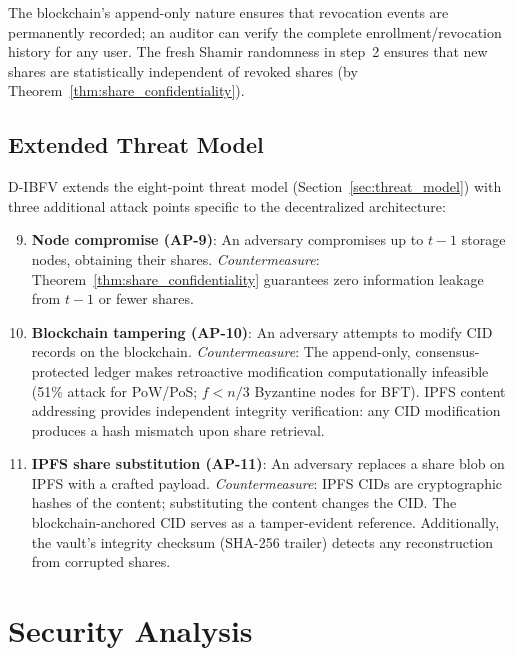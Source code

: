 \documentclass[3p,twocolumn]{elsarticle}
\newcommand{\DIBFV}{\textsf{D-IBFV}}
\begin{document}
\noindent The blockchain's append-only nature ensures that revocation events are permanently recorded; an auditor can verify the complete enrollment/revocation history for any user. The fresh Shamir randomness in step~2 ensures that new shares are statistically independent of revoked shares (by Theorem~\ref{thm:share_confidentiality}).

\subsection{Extended Threat Model}
\label{sec:extended_threat}

\DIBFV{} extends the eight-point threat model (Section~\ref{sec:threat_model}) with three additional attack points specific to the decentralized architecture:

\begin{enumerate}
    \setcounter{enumi}{8}
    \item \textbf{Node compromise (AP-9)}: An adversary compromises up to $t{-}1$ storage nodes, obtaining their shares. \emph{Countermeasure}: Theorem~\ref{thm:share_confidentiality} guarantees zero information leakage from $t{-}1$ or fewer shares.
    \item \textbf{Blockchain tampering (AP-10)}: An adversary attempts to modify CID records on the blockchain. \emph{Countermeasure}: The append-only, consensus-protected ledger makes retroactive modification computationally infeasible (51\% attack for PoW/PoS; $f < n/3$ Byzantine nodes for BFT). IPFS content addressing provides independent integrity verification: any CID modification produces a hash mismatch upon share retrieval.
    \item \textbf{IPFS share substitution (AP-11)}: An adversary replaces a share blob on IPFS with a crafted payload. \emph{Countermeasure}: IPFS CIDs are cryptographic hashes of the content; substituting the content changes the CID. The blockchain-anchored CID serves as a tamper-evident reference. Additionally, the vault's integrity checksum (SHA-256 trailer) detects any reconstruction from corrupted shares.
\end{enumerate}

\section{Security Analysis}
\label{sec:security}
\end{document}
